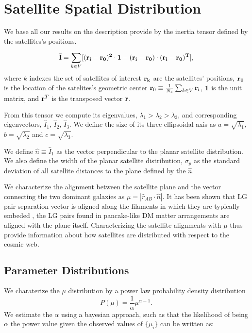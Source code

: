 \documentclass[a4paper,fleqn,usenatbib]{mnras}
\begin{document}
\section{Satellite Spatial Distribution}
\label{sec:SpatialMeasurements}

We base all our results on the description provide by the inertia
tensor defined by the satellites's positions.  

\begin{equation}
{\bf{\bar{I}}} = \sum_{k \in V}[(\bf{r}_i - \bf{r}_0)^2\cdot \bf{1} -
  (\bf{r}_i-\bf{r}_0)\cdot (\bf{r}_i - \bf{r}_0)^{T}],
\end{equation}
%
where $k$ indexes the set of satellites of interest
$\bf{r}_k$ are the satellites' positions, $\bf{r}_{0}$ is the location
of the satelites's geometric center ${\bf r}_{0}\equiv \frac{1}{N_s}\sum_{k\in
  V} \bf{r}_i$, $\bf{1}$ is the unit matrix,  and  
${\bf r}^T$ is the transposed vector $\bf{r}$. 

From this tensor we compute its eigenvalues,
$\lambda_1>\lambda_2>\lambda_3$, and corresponding eigenvectors,
$\hat{I}_1$, $\hat{I}_2$, $\hat{I}_3$.
We define the size of its three ellipsoidal axis as
$a=\sqrt{\lambda_1}$, $b=\sqrt{\lambda_2}$ and $c=\sqrt{\lambda_3}$.

We define $\hat{n}\equiv \hat{I}_1$ as the vector perpendicular to the
planar satellite distribution. 
We also define the width of the planar satellite distribution,
$\sigma_p$ as the standard deviation of all satellite distances to the
plane defined by the $\hat{n}$.

We characterize the alignment between the satellite plane and the
vector connecting the two dominant galaxies as $\mu=|\hat{r}_{AB}\cdot
\hat{n}|$. 
It has been shown that LG pair separation vector is aligned along the
filaments in  which they are typically embeded
\cite{2015ApJ...799...45F}, the LG pairs found in pancake-like DM
matter arrangements are aligned with the plane itself. 
Characterizing the satellite alignments with $\mu$ thus provide
information about how satellites are distributed with respect to the
cosmic web. 

\subsection{Parameter Distributions}

We charaterize the $\mu$ distribution by a power law probability
density distribution
\begin{equation}
P(\mu) = \frac{1}{\alpha}\mu^{\alpha-1}.
\end{equation}
We estimate the $\alpha$ using a bayesian approach, such as that
the likelihood of being $\alpha$ the power value given the observed values of $\{\mu_i\}$
  can be written as:
\end{document}
